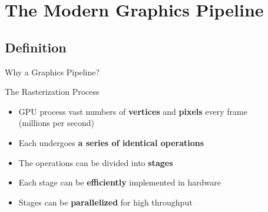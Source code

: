 \section{The Modern Graphics Pipeline}

\subsection{Definition}
\begin{frame}{Why a Graphics Pipeline?}
  \begin{raybox}{The Rasterization Process}
    \small
    \begin{itemize}
      \item<1-> GPU process vast numbers of \textbf{vertices} and \textbf{pixels} every frame \\
        (millions per second)
      \item<2-> Each undergoes \textbf{a series of identical operations}
      \item<3-> The operations can be divided into \textbf{stages}
      \item<4-> Each stage can be \textbf{efficiently} implemented in hardware
      \item<5-> Stages can be \textbf{parallelized} for high throughput
    \end{itemize}
  \end{raybox}
\end{frame}

